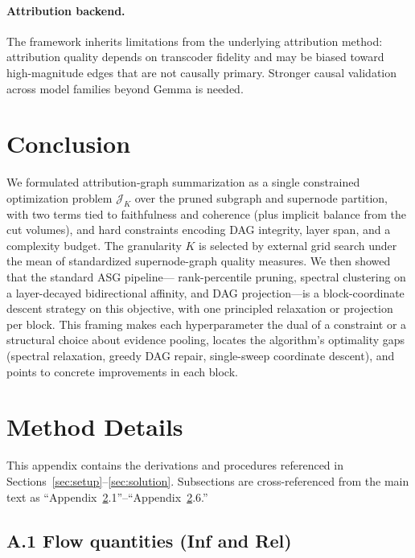 \documentclass[table, 11pt]{article}
\begin{document}
\paragraph{Attribution backend.} The framework inherits limitations
from the underlying attribution method: attribution quality depends
on transcoder fidelity and may be biased toward high-magnitude edges
that are not causally primary. Stronger causal validation across
model families beyond Gemma is needed.

\section{Conclusion}

We formulated attribution-graph summarization as a single
constrained optimization problem $\mathcal{J}_K$ over the pruned
subgraph and supernode partition, with two terms tied to
faithfulness and coherence (plus implicit balance from the cut
volumes), and hard constraints encoding DAG integrity, layer span,
and a complexity budget. The granularity $K$ is selected by external
grid search under the mean of standardized supernode-graph quality
measures. We then showed that the standard ASG pipeline---
rank-percentile pruning, spectral clustering on a layer-decayed
bidirectional affinity, and DAG projection---is a block-coordinate
descent strategy on this objective, with one principled relaxation
or projection per block. This framing makes each hyperparameter the
dual of a constraint or a structural choice about evidence pooling,
locates the algorithm's optimality gaps (spectral relaxation, greedy
DAG repair, single-sweep coordinate descent), and points to concrete
improvements in each block.





\appendix
\appendix

\section{Method Details}\label{app:method}

This appendix contains the derivations and procedures referenced in
Sections~\ref{sec:setup}--\ref{sec:solution}. Subsections are
cross-referenced from the main text as
``Appendix~\ref{app:method}.1''--``Appendix~\ref{app:method}.6.''

\subsection*{A.1 Flow quantities (Inf and Rel)}\label{app:flow}
\end{document}
